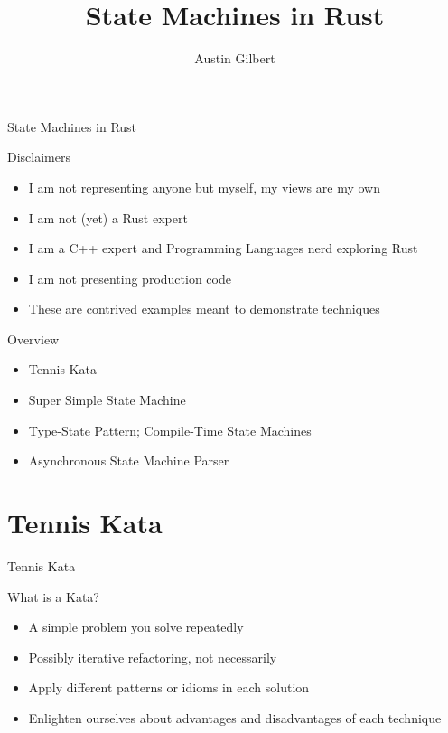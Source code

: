 \documentclass[aspectratio=169]{beamer}
\title{State Machines in Rust}
\author{Austin Gilbert}
\begin{document}
\begin{frame}
\begin{center}
\begin{Huge}
State Machines in Rust
\end{Huge}
\end{center}
\end{frame}

\begin{frame}{Disclaimers}
\begin{itemize}
\item I am not representing anyone but myself, my views are my own
\item I am not (yet) a Rust expert
\item I am a C++ expert and Programming Languages nerd exploring Rust
\item I am not presenting production code
\item These are contrived examples meant to demonstrate techniques
\end{itemize}
\end{frame}

\begin{frame}{Overview}
\begin{itemize}
\item Tennis Kata
\item Super Simple State Machine
\item Type-State Pattern; Compile-Time State Machines
\item Asynchronous State Machine Parser
\end{itemize}
\end{frame}

\section{Tennis Kata}
\begin{frame}
\begin{center}
\begin{Huge}
Tennis Kata
\end{Huge}
\end{center}
\end{frame}

\begin{frame}{What is a Kata?}
\begin{itemize}
\item A simple problem you solve repeatedly
\item Possibly iterative refactoring, not necessarily
\item Apply different patterns or idioms in each solution
\item Enlighten ourselves about advantages and disadvantages of each technique
\end{itemize}
\end{frame}
\end{document}
